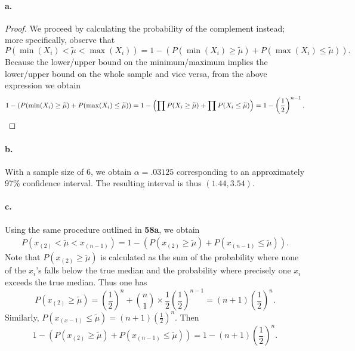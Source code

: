 \documentclass{exam}
\newcommand{\paren}[1]{\left(#1\right)}
\begin{document}
\paragraph{a.}
\begin{proof}
	We proceed by calculating the probability of the complement instead; more specifically, observe that
	\[
		P(\min(X_i) < \widetilde{\mu} < \max(X_i)) = 1 - (P(\min(X_i) \ge \widetilde{\mu}) + P(\max(X_i) \le \widetilde{\mu})).
	\]
	Because the lower/upper bound on the minimum/maximum implies the lower/upper bound on the whole sample and vice versa, from the above expression we obtain
	\[
		1 - (P(\min(X_i) \ge \widetilde{\mu}) + P(\max(X_i) \le \widetilde{\mu})) = 1 - \paren{\prod P(X_i \ge \widetilde{\mu}) + \prod P(X_i \le \widetilde{\mu})} = 1 - \paren{\frac12}^{n - 1}. \qedhere
	\]
\end{proof}

\paragraph{b.} With a sample size of $6$, we obtain $\alpha = .03125$ corresponding to an approximately 97\% confidence interval. The resulting interval is thus $(1.44, 3.54)$.

\paragraph{c.} Using the same procedure outlined in \textbf{58a}, we obtain
\begin{align}
	P\paren{x_{(2)} < \widetilde{\mu} < x_{(n - 1)}} = 1 - \paren{P(x_{(2)} \ge \widetilde{\mu}) + P(x_{(n - 1)} \le \widetilde{\mu})}.
\end{align}
Note that $P(x_{(2)} \ge \widetilde{\mu})$ is calculated as the sum of the probability where none of the $x_i$'s falls below the true median and the probability where precisely one $x_i$ exceeds the true median. Thus one has
\[
	P(x_{(2)} \ge \widetilde{\mu}) = \paren{\frac12}^n + \binom n1 \times\frac12\paren{\frac12}^{n - 1} = (n + 1)\paren{\frac12}^n.
\]
Similarly, $P(x_{(x - 1)} \le \widetilde{\mu}) = (n + 1)\paren{\frac12}^{n}$. Then
\[
	1 - \paren{P(x_{(2)} \ge \widetilde{\mu}) + P(x_{(n - 1)} \le \widetilde{\mu})} = 1 - (n + 1)\paren{\frac12}^n.
\]
\end{document}
